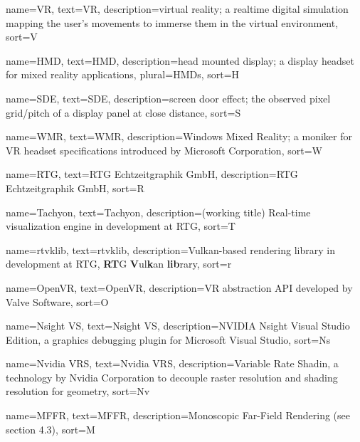 
{
  name=VR,
  text=VR,
  description={virtual reality; a realtime digital simulation mapping the user's movements to immerse them in the virtual environment}, 
  sort=V
}

{
  name=HMD,
  text=HMD,
  description={head mounted display; a display headset for mixed reality applications}, 
  plural=HMDs, 
  sort=H
}

{
  name=SDE,
  text=SDE,
  description={screen door effect; the observed pixel grid/pitch of a display panel at close distance}, 
  sort=S
}

{
  name=WMR,
  text=WMR,
  description={Windows Mixed Reality; a moniker for \gls{VR} headset specifications introduced by Microsoft Corporation}, 
  sort=W
}

{
  name=RTG,
  text=RTG Echtzeitgraphik GmbH,
  description={RTG Echtzeitgraphik GmbH}, 
  sort=R
}

{
  name=Tachyon,
  text=Tachyon,
  description={(working title) Real-time visualization engine in development at \gls{RTG}}, 
  sort=T
}

{
  name=rtvklib,
  text=rtvklib,
  description={Vulkan-based rendering library in development at \gls{RTG}, \textbf{RT}G \textbf{V}ul\textbf{k}an \textbf{lib}rary}, 
  sort=r
}

{
  name=OpenVR,
  text=OpenVR,
  description={\gls{VR} abstraction API developed by Valve Software}, 
  sort=O
}

{
  name=Nsight VS,
  text=Nsight VS,
  description={NVIDIA Nsight Visual Studio Edition, a graphics debugging plugin for Microsoft Visual Studio\cite{NvidiaCorporation.2013}}, 
  sort=Ns
}

{
  name=Nvidia VRS,
  text=Nvidia VRS,
  description={Variable Rate Shadin, a technology by Nvidia Corporation to decouple raster resolution and shading resolution for geometry\cite{NvidiaCorporation.2018}}, 
  sort=Nv
}

{
  name=MFFR,
  text=MFFR,
  description={Monoscopic Far-Field Rendering (see section 4.3)}, 
  sort=M
}











